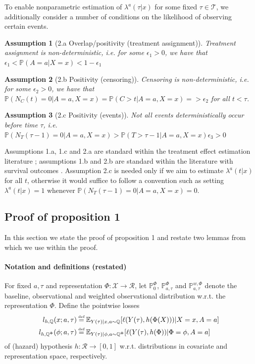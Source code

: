 \documentclass{article}
\newtheorem{assumption}{Assumption}
\newcommand{\Tc}{{\mathcal T}}
\newcommand{\minus}{{-}} %
\newcommand{\PR}{{\mathbb P}}
\newcommand\defeq{\mathrel{\stackrel{\makebox[0pt]{\mbox{\normalfont\tiny def}}}{=}}}
\begin{document}
To enable nonparametric estimation of $\lambda^{a}(\tau|x)$ for some fixed $\tau \in \Tc$, we additionally consider a number of conditions on the likelihood of observing certain events.

\begin{assumption}[2.a Overlap/positivity (treatment assignment)] Treatment assignment is non-deterministic, i.e. for some $\epsilon_1>0$, we have that
$\epsilon_1 < \PR(A=a|X=x)<1-\epsilon_1$
\end{assumption}

\begin{assumption}[2.b Positivity (censoring)] Censoring is non-deterministic, i.e. for some $\epsilon_2>0$, we have that  $\PR(N_C(t)=0|A=a, X=x) = \PR(C>t|A=a, X=x) = >\epsilon_2$ for all $t < \tau$.
\end{assumption}

\begin{assumption}[2.c Positivity (events)] Not all events deterministically occur before time $\tau$, i.e.  $\mathbb{P}(N_T(\tau \minus 1)=0|A=a, X=x)> \PR(T>\tau-1|A=a, X=x) \epsilon_3>0$
\end{assumption}


Assumptions 1.a, 1.c and 2.a are standard within the treatment effect estimation literature \cite{alaa2018limits, Shalit:16}; assumptions 1.b and 2.b are standard within the literature with survival outcomes \cite{diaz2018targeted, cui2020estimating}. Assumption 2.c is needed only if we aim to estimate $\lambda^a(t|x)$ for all $t$, otherwise it would suffice to follow a convention such as setting $\lambda^a(t|x)=1$ whenever $\mathbb{P}(N_T(\tau \minus 1)=0|A=a, X=x)=0$.

\subsection{Proof of proposition 1}
In this section we state the proof of proposition 1 and restate two lemmas from \cite{johansson2019support} which we use within the proof.

\paragraph{Notation and definitions (restated)}
For fixed $a, \tau$ and representation $\Phi: \mathcal{X} \rightarrow \mathcal{R}$, let $\mathbb{P}_0^{\Phi}$, $\mathbb{P}^{\Phi}_{a, \tau}$ and $\mathbb{P}^{w, \Phi}_{a, \tau}$ denote the baseline, observational and weighted observational distribution w.r.t. the representation $\Phi$. Define the pointwise losses
\begin{equation}
\begin{split}
    l_{h, \mathbb{Q}}(x; a, \tau) &\defeq \mathbb{E}_{Y(\tau)|x, a \sim \mathbb{Q}}[\ell(Y(\tau), h(\Phi(X)))|X=x, A=a] \\
    l_{h, \mathbb{Q}^\Phi}(\phi; a, \tau) &\defeq \mathbb{E}_{Y(\tau)|\phi, a \sim \mathbb{Q}^\Phi}[\ell(Y(\tau), h(\Phi))|\Phi=\phi, A=a]
\end{split}
\end{equation}
of (hazard) hypothesis $h: \mathcal{R} \rightarrow [0,1]$ w.r.t. distributions in covariate and representation space, respectively. 
 
\end{document}
